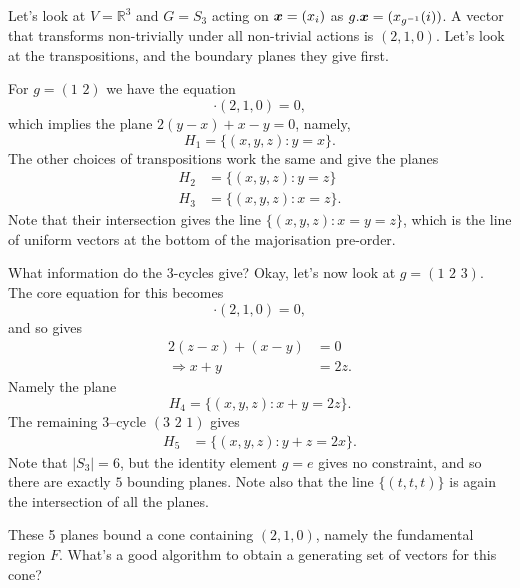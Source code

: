 \documentclass[pra,
aps,
twocolumn,
superscriptaddress,
groupedaddress,
nofootinbib,
reprint
]{revtex4-1}
\begin{document}
Let's look at $V = \mathbb{R}^3$ and $G=S_3$ acting on $\boldsymbol{x} = (x_i)$ as $g.\boldsymbol{x} = (x_{g^{-1}}(i))$. A vector that transforms non-trivially under all non-trivial actions is $(2,1,0)$. Let's look at the transpositions, and the boundary planes they give first.

For $g= (1\,\,2)$ we have the equation
\begin{equation}
[(y,x,z) - (x,y,z)] \cdot (2,1,0) = 0,
\end{equation}
which implies the plane $2(y-x)+ x-y = 0$, namely,
\begin{equation}
H_1 = \{(x,y,z) : y=x\}.
\end{equation}
The other choices of transpositions work the same and give the planes
\begin{align}
H_2 &= \{(x,y,z) : y=z\} \\
H_3 &= \{(x,y,z) : x=z\}.
\end{align}
Note that their intersection gives the line $\{(x,y,z) : x=y=z\}$, which is the line of uniform vectors at the bottom of the majorisation pre-order.

What information do the $3$-cycles give? Okay, let's now look at $g=( 1 \,\, 2 \,\, 3)$. The core equation for this becomes
\begin{equation}
[(z,x,y) - (x,y,z)] \cdot (2,1,0) = 0,
\end{equation}
and so gives
\begin{align}
2(z-x) + (x-y) &= 0 \nonumber \\
\Rightarrow x+y &=2z. 
\end{align}
Namely the plane
\begin{equation}
H_4 = \{(x,y,z) :  x+y =2z\}.
\end{equation}The remaining $3$--cycle $(3\,\,2\,\,1)$ gives
\begin{align}
H_5 &= \{(x,y,z) : y+z = 2x\}.
\end{align}
Note that $|S_3| = 6$, but the identity element $g=e$ gives no constraint, and so there are exactly $5$ bounding planes. Note also that the line $\{ (t,t,t)\} $ is again the intersection of all the planes.

These 5 planes bound a cone containing $(2,1,0)$, namely the fundamental region $F$. What's a good algorithm to obtain a generating set of vectors for this cone?
\end{document}
